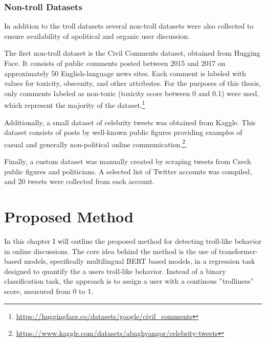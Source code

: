 \documentclass[twoside]{ctuthesis}
\theoremstyle{plain}
\theoremstyle{definition}
\theoremstyle{note}
\begin{document}
\subsection{Non-troll Datasets}
In addition to the troll datasets several non-troll datasets were also collected to ensure availability of apolitical and organic user discussion.\par
The first non-troll dataset is the Civil Comments dataset, obtained from Hugging Face. It consists of public comments posted between 2015 and 2017 on approximately 50 English-language news sites. Each comment is labeled with values for toxicity, obscenity, and other attributes. For the purposes of this thesis, only comments labeled as non-toxic (toxicity score between 0 and 0.1) were used, which represent the majority of the dataset.\footnote{\url{https://huggingface.co/datasets/google/civil_comments}}\par

Additionally, a small dataset of celebrity tweets was obtained from Kaggle. This dataset consists of posts by well-known public figures providing examples of casual and generally non-political online communication.\footnote{\url{https://www.kaggle.com/datasets/abaghyangor/celebrity-tweets}}.\par

Finally, a custom dataset was manually created by scraping tweets from Czech public figures and politicians. A selected list of Twitter accounts was compiled, and 20 tweets were collected from each account. \par

\chapter{Proposed Method}
In this chapter I will outline the proposed method for detecting troll-like behavior in online discussions. The core idea behind the method is the use of transformer-based models, specifically multilingual BERT based models, in a regression task designed to quantify the a users troll-like behavior. Instead of a binary classification task, the approach is to assign a user with a continous ''trolliness'' score, measured from 0 to 1.\par
\end{document}

